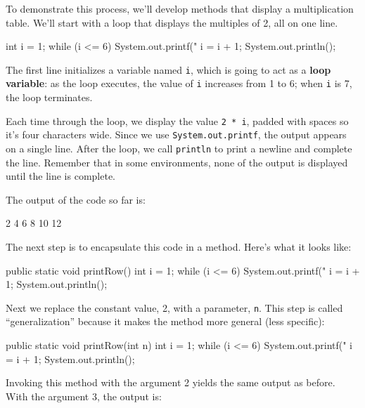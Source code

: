\documentclass[12pt]{book}
\theoremstyle{exercise}
\newcommand{\java}[1]{\verb"#1"}
\begin{document}
To demonstrate this process, we'll develop methods that display a multiplication table.
We'll start with a loop that displays the multiples of 2, all on one line.

\begin{code}
    int i = 1;
    while (i <= 6) {
        System.out.printf("%
        i = i + 1;
    }
    System.out.println();
\end{code}


The first line initializes a variable named \java{i}, which is going to act as a {\bf loop variable}: as the loop executes, the value of \java{i} increases from 1 to 6; when \java{i} is 7, the loop terminates.

Each time through the loop, we display the value \java{2 * i}, padded with spaces so it's four characters wide.
Since we use \java{System.out.printf}, the output appears on a single line.
After the loop, we call \java{println} to print a newline and complete the line.
Remember that in some environments, none of the output is displayed until the line is complete.

The output of the code so far is:

\begin{stdout}
    2    4    6    8   10   12
\end{stdout}


The next step is to encapsulate this code in a method.
Here's what it looks like:

\begin{code}
    public static void printRow() {
        int i = 1;
        while (i <= 6) {
            System.out.printf("%
            i = i + 1;
        }
        System.out.println();
    }
\end{code}

Next we replace the constant value, 2, with a parameter, \java{n}.
This step is called ``generalization'' because it makes the method more general (less specific):

\begin{code}
    public static void printRow(int n) {
        int i = 1;
        while (i <= 6) {
            System.out.printf("%
            i = i + 1;
        }
        System.out.println();
    }
\end{code}

Invoking this method with the argument 2 yields the same output as before.
With the argument 3, the output is:
\end{document}
